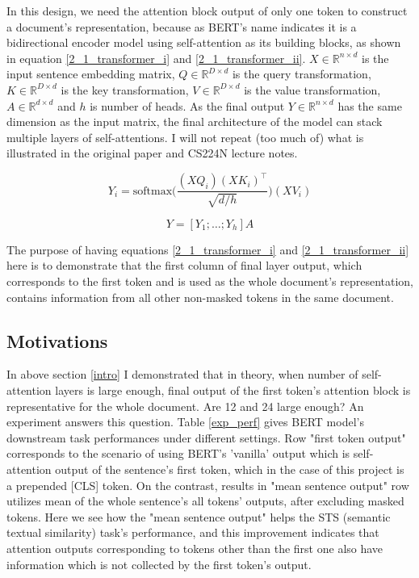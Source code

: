\documentclass{article}
\begin{document}
In this design, we need the attention block output of only one token to construct a document's representation, because as BERT's name indicates it is a bidirectional encoder model using self-attention as its building blocks, as shown in equation \ref{2_1_transformer_i} and \ref{2_1_transformer_ii}. $X\in \mathbb{R}^{n\times d}$ is the input sentence embedding matrix, $Q\in \mathbb{R}^{D\times d}$ is the query transformation, $K\in \mathbb{R}^{D\times d}$ is the key transformation, $V\in \mathbb{R}^{D\times d}$ is the value transformation, $A\in \mathbb{R}^{d\times d}$ and $h$ is number of heads. As the final output $Y\in \mathbb{R}^{n\times d}$ has the same dimension as the input matrix, the final architecture of the model can stack multiple layers of self-attentions. I will not repeat (too much of) what is illustrated in the original paper \citet{devlin2019bert} and CS224N lecture notes.


\begin{equation} 
Y_i = \text{softmax}\bigg(\frac{(XQ_i)(XK_i)^\top}{\sqrt{d/h}}\bigg)(XV_i)
\label{2_1_transformer_i}
\end{equation}

\begin{equation} 
Y = [Y_1;\dots;Y_h]A
\label{2_1_transformer_ii}
\end{equation}


The purpose of having equations \ref{2_1_transformer_i} and \ref{2_1_transformer_ii} here is to demonstrate that the first column of final layer output, which corresponds to the first token and is used as the whole document's representation, contains information from all other non-masked tokens in the same document.

\subsection{Motivations}
\label{motiv}
In above section \ref{intro} I demonstrated that in theory, when number of self-attention layers is large enough, final output of the first token's attention block is representative for the whole document. Are 12 and 24 large enough? An experiment answers this question. Table \ref{exp_perf} gives BERT model's downstream task performances under different settings. Row "first token output" corresponds to the scenario of using BERT's 'vanilla' output which is self-attention output of the sentence's first token, which in the case of this project is a prepended [CLS] token. On the contrast, results in "mean sentence output" row utilizes mean of the whole sentence's all tokens' outputs, after excluding masked tokens. Here we see how the "mean sentence output" helps the STS (semantic textual similarity) task's performance, and this improvement indicates that attention outputs corresponding to tokens other than the first one also have information which is not collected by the first token's output. 
\end{document}
